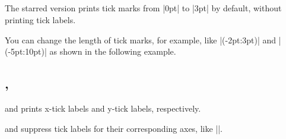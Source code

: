 \begin{tzcode}{.3}
\end{tzcode}

\subsection{\protect\cmd{\tzticks*}}
\label{ssi:tzticks*}

The starred version \icmd{\tzticks*} prints tick marks from |0pt| to |3pt| by default, without printing tick labels.

\begin{tzcode}{.3}
\end{tzcode}

You can change the length of tick marks, for example, like |(-2pt:3pt)| and |(-5pt:10pt)| as shown in the following example.

\begin{tzcode}{.3}
\end{tzcode}


\subsection{\protect\cmd{\tzticksx(*)}, \protect\cmd{\tzticksy(*)}}
\label{ssi:tztikcsx}

\icmd{\tzticksx} and \icmd{\tzticksy} prints x-tick labels and y-tick labels, respectively.

\begin{tzcode}{.3}
\end{tzcode}

\icmd{\tzticksx*} and \icmd{\tzticksy*} suppress tick labels for their corresponding axes, like |\tzticks*|.

